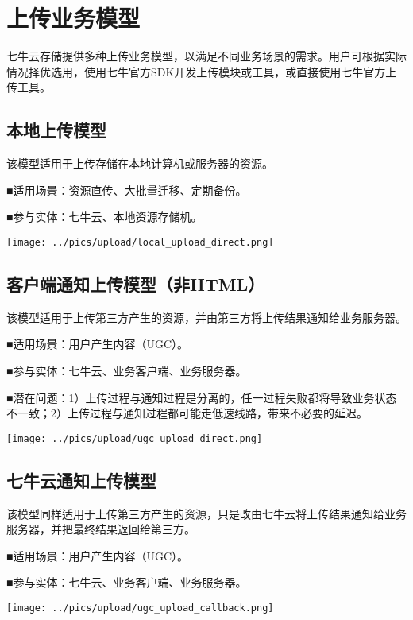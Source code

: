 \documentclass[11pt, oneside]{book}
\newcommand{\qpara}[1]{
\vspace{0.3em}
\noindent
#1\par
\vspace{0.3em}
}
\begin{document}
\chapter{上传业务模型}

\qpara{七牛云存储提供多种上传业务模型，以满足不同业务场景的需求。用户可根据实际情况择优选用，使用七牛官方SDK开发上传模块或工具，或直接使用七牛官方上传工具。}

\section{本地上传模型}

\qpara{该模型适用于上传存储在本地计算机或服务器的资源。}
\qpara{■\thinspace 适用场景：资源直传、大批量迁移、定期备份。}
\qpara{■\thinspace 参与实体：七牛云、本地资源存储机。}

\begin{center}
\texttt{[image: ../pics/upload/local\_upload\_direct.png]}
\end{center}

\section{客户端通知上传模型（非HTML）}

\qpara{该模型适用于上传第三方产生的资源，并由第三方将上传结果通知给业务服务器。}
\qpara{■\thinspace 适用场景：用户产生内容（UGC）。}
\qpara{■\thinspace 参与实体：七牛云、业务客户端、业务服务器。}
\qpara{■\thinspace 潜在问题：1）上传过程与通知过程是分离的，任一过程失败都将导致业务状态不一致；2）上传过程与通知过程都可能走低速线路，带来不必要的延迟。}

\begin{center}
\texttt{[image: ../pics/upload/ugc\_upload\_direct.png]}
\end{center}

\section{七牛云通知上传模型}

\qpara{该模型同样适用于上传第三方产生的资源，只是改由七牛云将上传结果通知给业务服务器，并把最终结果返回给第三方。}
\qpara{■\thinspace 适用场景：用户产生内容（UGC）。}
\qpara{■\thinspace 参与实体：七牛云、业务客户端、业务服务器。}

\begin{center}
\texttt{[image: ../pics/upload/ugc\_upload\_callback.png]}
\end{center}
\end{document}
